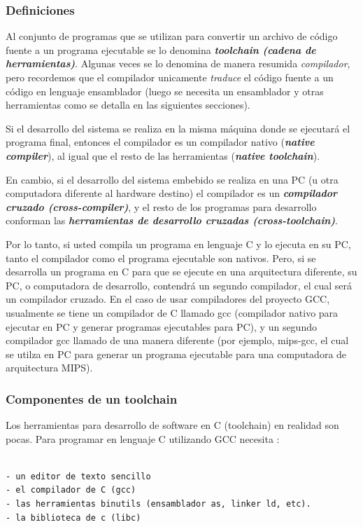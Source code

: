 \documentclass[output=paper, 
colorlinks,
citecolor=brown,
newtxmath
]{langscibook}
\begin{document}
\subsubsection{Definiciones}

Al conjunto de programas que se utilizan para convertir un
archivo de código fuente a un programa ejecutable se lo denomina
\textit{\textbf{toolchain (cadena de herramientas)}}. Algunas veces
se lo denomina de manera resumida \textit{compilador}, pero recordemos
que el compilador unicamente \textit{traduce} el código fuente 
a un código en lenguaje ensamblador (luego se necesita un ensamblador
y otras herramientas como se detalla en las siguientes secciones).

Si el desarrollo del sistema se realiza en la misma máquina
donde se ejecutará el programa final, entonces el compilador es un compilador 
nativo (\textit{\textbf{native compiler}}),
al igual que el resto de las herramientas 
(\textit{\textbf{native toolchain}}).

En cambio, si el desarrollo del sistema embebido se realiza en una PC
(u otra computadora diferente al hardware destino) el compilador
es un \textit{\textbf{compilador cruzado (cross-compiler)}}, y el resto
de los programas para desarrollo conforman las \textit{\textbf{herramientas
de desarrollo cruzadas (cross-toolchain)}}.

Por lo tanto, si usted compila un programa en lenguaje C y lo ejecuta
en su PC, tanto el compilador como el programa ejecutable son nativos.
Pero, si se desarrolla un programa en C para que se ejecute
en una arquitectura diferente, su PC, o computadora de desarrollo,
contendrá un segundo compilador, el cual será un compilador cruzado.
En el caso de usar compiladores del proyecto GCC, usualmente 
se tiene un compilador de C llamado gcc (compilador nativo para ejecutar
en PC y generar programas ejecutables para PC), y un segundo compilador
gcc llamado de una manera diferente (por ejemplo, mips-gcc, el cual
se utilza en PC para generar un programa ejecutable para una computadora
de arquitectura MIPS).

\subsubsection*{Componentes de un toolchain}

Los herramientas para desarrollo de software en C (toolchain) en realidad
son pocas. Para programar en lenguaje C utilizando GCC necesita :

\begin{verbatim}

- un editor de texto sencillo
- el compilador de C (gcc)
- las herramientas binutils (ensamblador as, linker ld, etc).
- la biblioteca de c (libc)

\end{verbatim}
\end{document}
